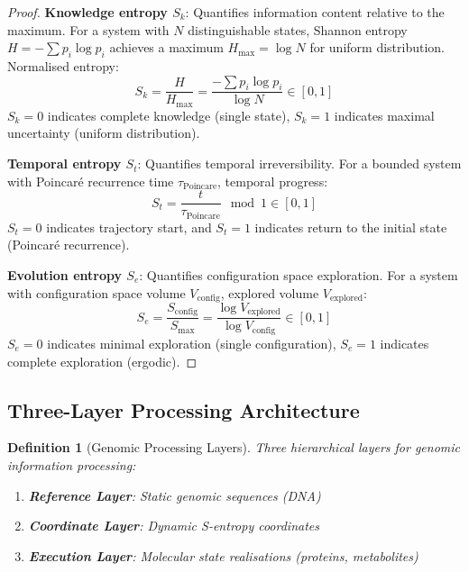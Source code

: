 \documentclass[11pt,a4paper]{article}
\newtheorem{definition}[theorem]{Definition}
\theoremstyle{remark}
\newcommand{\Sk}{S_k}
\newcommand{\St}{S_t}
\newcommand{\Se}{S_e}
\begin{document}
\begin{proof}
\textbf{Knowledge entropy $\Sk$}: Quantifies information content relative to the maximum. For a system with $N$ distinguishable states, Shannon entropy $H = -\sum p_i \log p_i$ achieves a maximum $H_{\text{max}} = \log N$ for uniform distribution. Normalised entropy:
\begin{equation}
\Sk = \frac{H}{H_{\text{max}}} = \frac{-\sum p_i \log p_i}{\log N} \in [0,1]
\end{equation}
$\Sk = 0$ indicates complete knowledge (single state), $\Sk = 1$ indicates maximal uncertainty (uniform distribution).

\textbf{Temporal entropy $\St$}: Quantifies temporal irreversibility. For a bounded system with Poincaré recurrence time $\tau_{\text{Poincare}}$, temporal progress:
\begin{equation}
\St = \frac{t}{\tau_{\text{Poincare}}} \mod 1 \in [0,1]
\end{equation}
$\St = 0$ indicates trajectory start, and $\St = 1$ indicates return to the initial state (Poincaré recurrence).

\textbf{Evolution entropy $\Se$}: Quantifies configuration space exploration. For a system with configuration space volume $V_{\text{config}}$, explored volume $V_{\text{explored}}$:
\begin{equation}
\Se = \frac{S_{\text{config}}}{S_{\text{max}}} = \frac{\log V_{\text{explored}}}{\log V_{\text{config}}} \in [0,1]
\end{equation}
$\Se = 0$ indicates minimal exploration (single configuration), $\Se = 1$ indicates complete exploration (ergodic).
\end{proof}

\subsection{Three-Layer Processing Architecture}

\begin{definition}[Genomic Processing Layers]
\label{def:processing_layers}
Three hierarchical layers for genomic information processing:
\begin{enumerate}
\item \textbf{Reference Layer}: Static genomic sequences (DNA)
\item \textbf{Coordinate Layer}: Dynamic S-entropy coordinates
\item \textbf{Execution Layer}: Molecular state realisations (proteins, metabolites)
\end{enumerate}
\end{definition}
\end{document}

